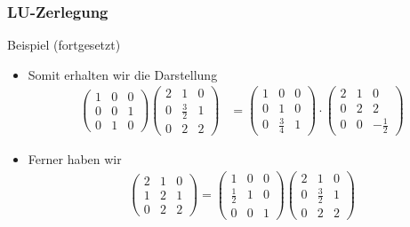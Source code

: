 \documentclass{beamer}
\newcommand{\mytitle}{LU-Zerlegung}
\begin{document}
\begin{frame}\frametitle{\mytitle}
	\begin{block}{Beispiel (fortgesetzt)}
		\begin{itemize}
			\item Somit erhalten wir die Darstellung
				\begin{align*}
					\begin{pmatrix} 1&0&0\\ 0&0&1\\0&1&0 \end{pmatrix}\begin{pmatrix} 2&1&0\\ 0&\frac{3}{2}&1\\ 0&2&2 \end{pmatrix}&=\begin{pmatrix}1&0&0\\0&1&0\\0&\frac{3}{4}&1\end{pmatrix}\cdot\begin{pmatrix} 2&1&0\\ 0&2&2\\ 0&0&-\frac{1}{2} \end{pmatrix}
				\end{align*}
			\item Ferner haben wir
				\begin{align*}
					\begin{pmatrix} 2&1&0\\ 1&2&1\\ 0&2&2  \end{pmatrix}=\begin{pmatrix} 1&0&0\\ \frac{1}{2}&1&0\\ 0&0&1 \end{pmatrix} \begin{pmatrix} 2&1&0\\ 0&\frac{3}{2}&1\\ 0&2&2 \end{pmatrix}
				\end{align*}
		\end{itemize}
	\end{block}
\end{frame}
\end{document}
